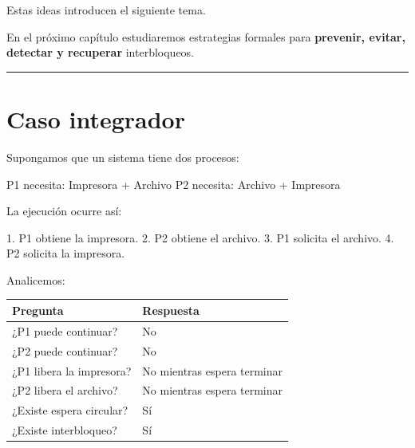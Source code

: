 \documentclass[
  spanish,
  letterpaper,
]{scrbook}
\newenvironment{Shaded}{\begin{snugshade}}{\end{snugshade}}
\newcommand{\NormalTok}[1]{\textcolor[rgb]{0.00,0.23,0.31}{#1}}
\newcounter{none} %
\begin{document}
\begin{tcolorbox}[enhanced jigsaw, arc=.35mm, bottomrule=.15mm, bottomtitle=1mm, breakable, colback=white, colbacktitle=quarto-callout-warning-color!10!white, colframe=quarto-callout-warning-color-frame, coltitle=black, left=2mm, leftrule=.75mm, opacityback=0, opacitybacktitle=0.6, rightrule=.15mm, title=\textcolor{quarto-callout-warning-color}{\faExclamationTriangle}\hspace{0.5em}{Importante}, titlerule=0mm, toprule=.15mm, toptitle=1mm]

Estas ideas introducen el siguiente tema.

En el próximo capítulo estudiaremos estrategias formales para
\textbf{prevenir, evitar, detectar y recuperar} interbloqueos.

\end{tcolorbox}

\begin{center}\rule{0.5\linewidth}{0.5pt}\end{center}


\chapter{Caso integrador}\label{caso-integrador-1}

Supongamos que un sistema tiene dos procesos:

\begin{Shaded}
\begin{Highlighting}[]
\NormalTok{P1 necesita: Impresora + Archivo}
\NormalTok{P2 necesita: Archivo + Impresora}
\end{Highlighting}
\end{Shaded}

La ejecución ocurre así:

\begin{Shaded}
\begin{Highlighting}[]
\NormalTok{1. P1 obtiene la impresora.}
\NormalTok{2. P2 obtiene el archivo.}
\NormalTok{3. P1 solicita el archivo.}
\NormalTok{4. P2 solicita la impresora.}
\end{Highlighting}
\end{Shaded}

Analicemos:

{\def\LTcaptype{none} %
\begin{longtable}[]{@{}ll@{}}
\toprule\noalign{}
Pregunta & Respuesta \\
\midrule\noalign{}
\endhead
\bottomrule\noalign{}
\endlastfoot
¿P1 puede continuar? & No \\
¿P2 puede continuar? & No \\
¿P1 libera la impresora? & No mientras espera terminar \\
¿P2 libera el archivo? & No mientras espera terminar \\
¿Existe espera circular? & Sí \\
¿Existe interbloqueo? & Sí \\
\end{longtable}
}
\end{document}
